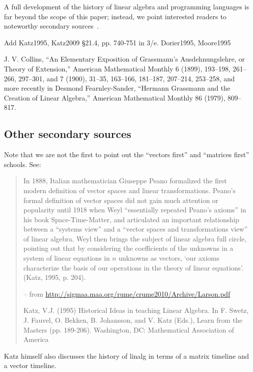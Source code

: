 A full development of the history of linear algebra and programming languages is
far beyond the scope of this paper; instead, we point interested readers to
noteworthy secondary sources~\cite{Parshall1985,Kleiner2007,Higham2009}.

Add Katz1995, Katz2009 \S 21.4, pp. 740-751 in 3/e.
Dorier1995, Moore1995

J. V. Collins, “An Elementary
Exposition of Grassmann’s Ausdehnungslehre, or Theory
of Extension,” American Mathematical Monthly 6
(1899), 193–198, 261–266, 297–301, and 7 (1900), 31–35,
163–166, 181–187, 207–214, 253–258, and more recently
in Desmond Fearnley-Sander, “Hermann Grassmann and
the Creation of Linear Algebra,” American Mathematical
Monthly 86 (1979), 809–817.

\subsection{Other secondary sources}


Note that we are not the first to point out the ``vectors first'' and ``matrices first'' schools.
See:

\begin{quote}
In 1888, Italian mathematician Giuseppe Peano formalized the first modern
definition of vector spaces and linear transformations. Peano's formal
definition of vector spaces did not gain much attention or popularity until
1918 when Weyl ``essentially repeated Peano's axioms'' in his book
Space-Time-Matter, and articulated an important relationship between a
``systems view'' and a ``vector spaces and transformations view'' of linear
algebra. Weyl then brings the subject of linear algebra full circle, pointing
out that by considering the coefficients of the unknowns in a system of linear
equations in $n$ unknowns as vectors, `our axioms characterize the basis of our
operations in the theory of linear equations'. (Katz, 1995, p. 204).

-- from \url{http://sigmaa.maa.org/rume/crume2010/Archive/Larson.pdf}

Katz, V.J. (1995) Historical Ideas in teaching Linear Algebra. In F. Swetz, J. Fauvel, O. Bekken,
B. Johansson, and V. Katz (Eds.), Learn from the Masters (pp. 189-206). Washington,
DC: Mathematical Association of America
\end{quote}

Katz himself also discusses the history of linalg in terms of a matrix timeline and a vector timeline.



